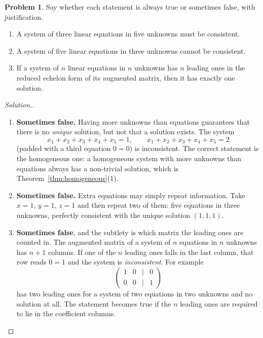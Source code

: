 \documentclass[11pt,a4paper]{article}
\theoremstyle{definition}
\newtheorem{problemx}{Problem}[section]
\newenvironment{problem}{\begin{problemx}}{\end{problemx}}
\newenvironment{solution}
  {\renewcommand{\qedsymbol}{}\begin{proof}[\textit{Solution}.]}
  {\end{proof}}
\begin{document}
\begin{problem}
Say whether each statement is always true or sometimes false, with
justification.
\begin{enumerate}
\item[(a)] A system of three linear equations in five unknowns must be
consistent.
\item[(b)] A system of five linear equations in three unknowns cannot be
consistent.
\item[(c)] If a system of $n$ linear equations in $n$ unknowns has $n$ leading
ones in the reduced echelon form of its augmented matrix, then it has exactly
one solution.
\end{enumerate}
\end{problem}
\begin{solution}
\begin{enumerate}
\item[(a)] \textbf{Sometimes false.} Having more unknowns than equations
guarantees that there is no \emph{unique} solution, but not that a solution
exists. The system
$$x_1+x_2+x_3+x_4+x_5=1,\qquad x_1+x_2+x_3+x_4+x_5=2$$
(padded with a third equation $0=0$) is inconsistent. The correct statement is
the homogeneous one: a homogeneous system with more unknowns than equations
always has a non-trivial solution, which is
Theorem~\ref{thm:homogeneous}(1).

\item[(b)] \textbf{Sometimes false.} Extra equations may simply repeat
information. Take $x=1$, $y=1$, $z=1$ and then repeat two of them: five
equations in three unknowns, perfectly consistent with the unique solution
$(1,1,1)$.

\item[(c)] \textbf{Sometimes false}, and the subtlety is which matrix the
leading ones are counted in. The augmented matrix of a system of $n$ equations
in $n$ unknowns has $n+1$ columns. If one of the $n$ leading ones falls in the
last column, that row reads $0=1$ and the system is \emph{inconsistent}. For
example
$$\begin{pmatrix}1&0&|&0\\0&0&|&1\end{pmatrix}$$
has two leading ones for a system of two equations in two unknowns and no
solution at all. The statement becomes true if the $n$ leading ones are
required to lie in the coefficient columns.
\end{enumerate}
\end{solution}

\pagebreak
\end{document}
